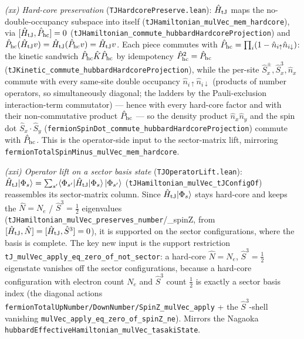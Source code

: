 \documentclass[a4paper,11pt]{article}
\begin{document}
\emph{(xx) Hard-core preservation} (\texttt{TJHardcorePreserve.lean}): $\hat H_{\rm tJ}$ maps the
no-double-occupancy subspace into itself (\texttt{tJHamiltonian\_mulVec\_mem\_hardcore}), via
$[\hat H_{\rm tJ},\hat P_{\rm hc}]=0$ (\texttt{tJHamiltonian\_commute\_hubbardHardcoreProjection})
and $\hat P_{\rm hc}(\hat H_{\rm tJ}v)=\hat H_{\rm tJ}(\hat P_{\rm hc}v)=\hat H_{\rm tJ}v$.  Each
piece commutes with $\hat P_{\rm hc}=\prod_i(1-\hat n_{i\uparrow}\hat n_{i\downarrow})$: the kinetic
sandwich $\hat P_{\rm hc}\hat K\hat P_{\rm hc}$ by idempotency $\hat P_{\rm hc}^2=\hat P_{\rm hc}$
(\texttt{tJKinetic\_commute\_hubbardHardcoreProjection}), while the per-site
$\hat S^\pm_x,\hat S^3_x,\hat n_x$ commute with every same-site double occupancy
$\hat n_{i\uparrow}\hat n_{i\downarrow}$ (products of number operators, so simultaneously diagonal;
the ladders by the Pauli-exclusion interaction-term commutator) --- hence with every hard-core
factor and with their non-commutative product $\hat P_{\rm hc}$ --- so the density product
$\hat n_x\hat n_y$ and the spin dot $\hat S_x\!\cdot\!\hat S_y$
(\texttt{fermionSpinDot\_commute\_hubbardHardcoreProjection}) commute with $\hat P_{\rm hc}$.  This is
the operator-side input to the sector-matrix lift, mirroring
\texttt{fermionTotalSpinMinus\_mulVec\_mem\_hardcore}.

\emph{(xxi) Operator lift on a sector basis state} (\texttt{TJOperatorLift.lean}):
$\hat H_{\rm tJ}|\Phi_s\rangle=\sum_{s'}\langle\Phi_{s'}|\hat H_{\rm tJ}|\Phi_s\rangle\,|\Phi_{s'}\rangle$
(\texttt{tJHamiltonian\_mulVec\_tJConfigOf}) reassembles its sector-matrix column.  Since
$\hat H_{\rm tJ}|\Phi_s\rangle$ stays hard-core and keeps the $\hat N=N_e$ / $\hat S^3=\tfrac12$
eigenvalues (\texttt{tJHamiltonian\_mulVec\_preserves\_number}/\_spinZ, from
$[\hat H_{\rm tJ},\hat N]=[\hat H_{\rm tJ},\hat S^3]=0$), it is supported on the sector
configurations, where the basis is complete.  The key new input is the support restriction
\texttt{tJ\_mulVec\_apply\_eq\_zero\_of\_not\_sector}: a hard-core $\hat N=N_e$, $\hat S^3=\tfrac12$
eigenstate vanishes off the sector configurations, because a hard-core configuration with electron
count $N_e$ and $\hat S^3$ count $\tfrac12$ is exactly a sector basis index (the diagonal actions
\texttt{fermionTotalUpNumber/DownNumber/SpinZ\_mulVec\_apply} + the $\hat S^3$-shell vanishing
\texttt{mulVec\_apply\_eq\_zero\_of\_spinZ\_ne}).  Mirrors the Nagaoka
\texttt{hubbardEffectiveHamiltonian\_mulVec\_tasakiState}.
\end{document}
